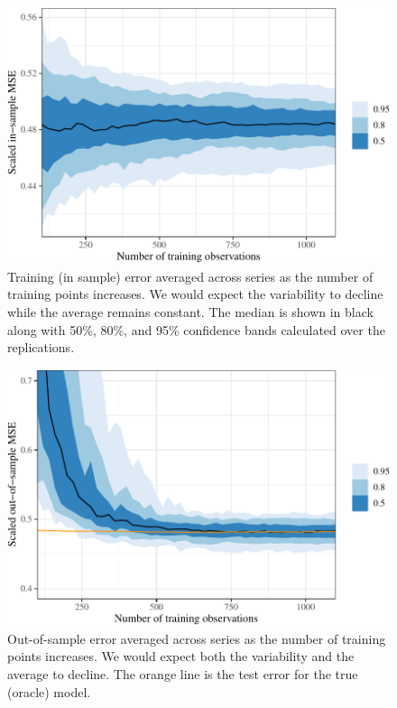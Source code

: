 \documentclass[11pt]{article}
\begin{document}
\begin{figure}[t]

{\centering \includegraphics{gfx/train-error-1} 

}

\caption{Training (in sample) error averaged across series as the number of training points increases. We would expect the variability to decline while the average remains constant. The median is shown in black along with 50\%, 80\%, and 95\% confidence bands calculated over the replications.}\label{fig:train-error}
\end{figure}

\begin{figure}[t]

{\centering \includegraphics{gfx/test-error-1} 

}

\caption{Out-of-sample error averaged across series as the number of training points increases. We would expect both the variability and the average to decline. The orange line is the test error for the true (oracle) model.}\label{fig:test-error}
\end{figure}
\end{document}
